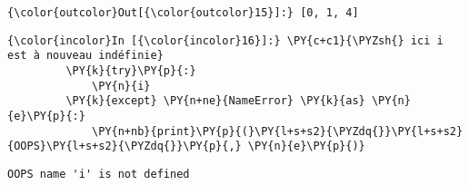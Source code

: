 \begin{Verbatim}[commandchars=\\\{\}]
{\color{outcolor}Out[{\color{outcolor}15}]:} [0, 1, 4]
\end{Verbatim}
            
    \begin{Verbatim}[commandchars=\\\{\}]
{\color{incolor}In [{\color{incolor}16}]:} \PY{c+c1}{\PYZsh{} ici i est à nouveau indéfinie}
         \PY{k}{try}\PY{p}{:}
             \PY{n}{i}
         \PY{k}{except} \PY{n+ne}{NameError} \PY{k}{as} \PY{n}{e}\PY{p}{:}
             \PY{n+nb}{print}\PY{p}{(}\PY{l+s+s2}{\PYZdq{}}\PY{l+s+s2}{OOPS}\PY{l+s+s2}{\PYZdq{}}\PY{p}{,} \PY{n}{e}\PY{p}{)}
\end{Verbatim}


    \begin{Verbatim}[commandchars=\\\{\}]
OOPS name 'i' is not defined

    \end{Verbatim}
